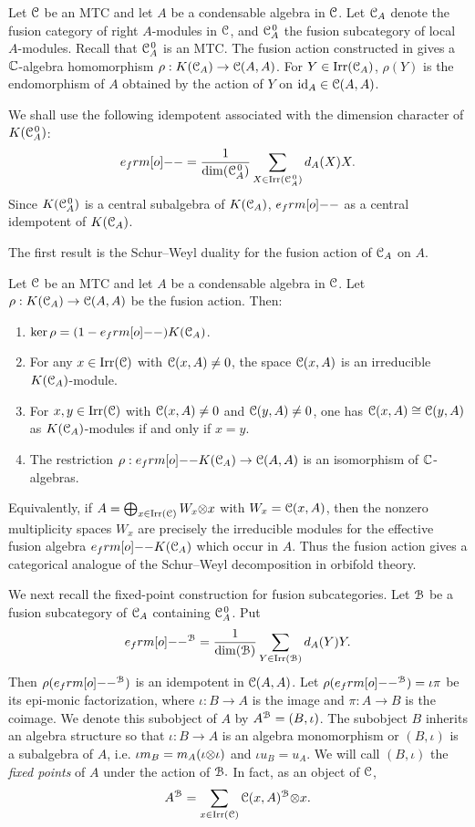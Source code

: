 \documentclass{amsart}
\begin{document}
Let ${\EuScript{C}}$ be an MTC and let $A$ be a condensable algebra in ${\EuScript{C}}$. Let
${{\EuScript{C}}_A}$ denote the fusion category of right $A$-modules in ${\EuScript{C}}$, and  ${{\EuScript{C}}_A^{\hspace{1pt}0}}$
 the fusion subcategory of local $A$-modules. Recall that ${{\EuScript{C}}_A^{\hspace{1pt}0}}$ is an
MTC. The fusion action constructed in \cite{DNRX2025} gives a $\mathbb{C}$-algebra
homomorphism
$\rho:K({{\EuScript{C}}_A})\to {\EuScript{C}}(A,A)$. For $Y\in\operatorname{Irr}({{\EuScript{C}}_A})$, $\rho(Y)$ is the
endomorphism of $A$ obtained by the action of $Y$ on
$\operatorname{id}_A\in{\EuScript{C}}(A,A)$.

We shall use the following idempotent associated with the dimension
character of $K({{\EuScript{C}}_A^{\hspace{1pt}0}})$:
\[
e_\1=\frac{1}{\dim(\CAo)}\sum_{X\in\irr(\CAo)}d_A(X)X.
\]
Since $K({{\EuScript{C}}_A^{\hspace{1pt}0}})$ is a central subalgebra of $K({{\EuScript{C}}_A})$,  $e_\1$ as a central idempotent
of $K({{\EuScript{C}}_A})$.

The first result is the Schur--Weyl duality for the fusion action of
${{\EuScript{C}}_A}$ on $A$.

\begin{thm}\label{t:SW-fusion}
Let ${\EuScript{C}}$ be an MTC and let $A$ be a condensable algebra in ${\EuScript{C}}$. Let
$\rho:K({{\EuScript{C}}_A})\to{\EuScript{C}}(A,A)$ be the fusion action. Then:
\begin{enumerate}
\item $\ker\rho=(1-e_\1)K(\CA)$.
\item For any $x\in\operatorname{Irr}({\EuScript{C}})$ with ${\EuScript{C}}(x,A)\ne 0$, the space ${\EuScript{C}}(x,A)$ is
an irreducible $K({{\EuScript{C}}_A})$-module.
\item For $x,y\in\operatorname{Irr}({\EuScript{C}})$ with ${\EuScript{C}}(x,A)\ne 0$ and ${\EuScript{C}}(y,A)\ne 0$, one
has ${\EuScript{C}}(x,A)\cong{\EuScript{C}}(y,A)$ as $K({{\EuScript{C}}_A})$-modules if and only if $x=y$.
\item The restriction $\rho:e_\1K(\CA)\to\CC(A,A)$ is an isomorphism of
$\mathbb{C}$-algebras.
\end{enumerate}
\end{thm}

Equivalently, if $A=\bigoplus_{x\in\operatorname{Irr}({\EuScript{C}})}W_x{\otimes} x$ with
$W_x={\EuScript{C}}(x,A)$, then the nonzero multiplicity spaces $W_x$ are precisely
the irreducible modules for the effective fusion algebra $e_\1K(\CA)$
which occur in $A$. Thus the fusion action gives a categorical analogue of
the Schur--Weyl decomposition in orbifold theory.

We next recall the fixed-point construction for fusion subcategories.   Let
${\EuScript{B}}$ be a fusion subcategory of ${{\EuScript{C}}_A}$ containing ${{\EuScript{C}}_A^{\hspace{1pt}0}}$. Put
\[
e_\1^\BB=\frac{1}{\dim(\BB)}\sum_{Y\in\irr(\BB)}d_A(Y)Y.
\]
Then $\rho(e_\1^\BB)$ is an idempotent in ${\EuScript{C}}(A,A)$. Let
$\rho(e_\1^\BB)=\iota\pi$ be its epi-monic factorization, where
$\iota:B\to A$ is the image and $\pi:A\to B$ is the coimage. We denote this
subobject of $A$ by $A^{\EuScript{B}}=(B,\iota)$. The subobject $B$ inherits an algebra structure so that $\iota: B \to A$ is an algebra monomorphism or $(B,\iota)$ is a subalgebra of $A$, i.e. $\iota m_B =m_A (\iota {\otimes}  \iota)$ and $\iota u_B = u_A$. We will call $(B,\iota)$ the \emph{fixed points} of $A$ under the action of ${\EuScript{B}}.$ In fact, as an object of ${\EuScript{C}}$,
\[
A^{\EuScript{B}}=\sum_{x\in\operatorname{Irr}({\EuScript{C}})}{\EuScript{C}}(x,A)^{\EuScript{B}}{\otimes} x.
\]
\end{document}
